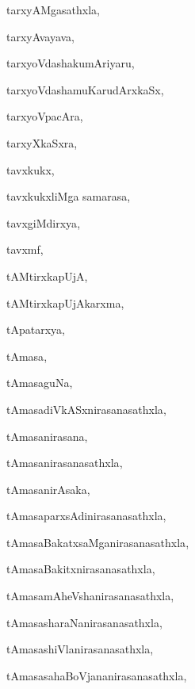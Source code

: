 \begin{multicols}{3}
{\noindent
{tarxyAMgasathxla}, \pageref{tarxyAMgasathxla}

\noindent
{tarxyAvayava}, \pageref{tarxyAvayava}

\noindent
{tarxyoVdashakumAriyaru}, \pageref{tarxyoVdashakumAriyaru}

\noindent
{tarxyoVdashamuKarudArxkaSx}, \pageref{tarxyoVdashamuKarudArxkaSx}

\noindent
{tarxyoVpacAra}, \pageref{tarxyoVpacAra}

\noindent
{tarxyXkaSxra}, \pageref{tarxyXkaSxra}

\noindent
{tavxkukx}, \pageref{tavxkukx}

\noindent
{tavxkukxliMga samarasa}, \pageref{tavxkukxliMga samarasa}

\noindent
{tavxgiMdirxya}, \pageref{tavxgiMdirxya}

\noindent
{tavxmf}, \pageref{tavxmf}

\noindent
{tAMtirxkapUjA}, \pageref{tAMtirxkapUjA}

\noindent
{tAMtirxkapUjAkarxma}, \pageref{tAMtirxkapUjAkarxma}

\noindent
{tApatarxya}, \pageref{tApatarxya}

\noindent
{tAmasa}, \pageref{tAmasa}

\noindent
{tAmasaguNa}, \pageref{tAmasaguNa}

\noindent
{tAmasadiVkASxnirasanasathxla}, \pageref{tAmasadiVkASxnirasanasathxla}

\noindent
{tAmasanirasana}, \pageref{tAmasanirasana}

\noindent
{tAmasanirasanasathxla}, \pageref{tAmasanirasanasathxla}

\noindent
{tAmasanirAsaka}, \pageref{tAmasanirAsaka}

\noindent
{tAmasaparxsAdinirasanasathxla}, \pageref{tAmasaparxsAdinirasanasathxla}

\noindent
{tAmasaBakatxsaMganirasanasathxla}, \pageref{tAmasaBakatxsaMganirasanasathxla}

\noindent
{tAmasaBakitxnirasanasathxla}, \pageref{tAmasaBakitxnirasanasathxla}

\noindent
{tAmasamAheVshanirasanasathxla}, \pageref{tAmasamAheVshanirasanasathxla}

\noindent
{tAmasasharaNanirasanasathxla}, \pageref{tAmasasharaNanirasanasathxla}

\noindent
{tAmasashiVlanirasanasathxla}, \pageref{tAmasashiVlanirasanasathxla}

\noindent
{tAmasasahaBoVjananirasanasathxla}, \pageref{tAmasasahaBoVjananirasanasathxla}

}
\end{multicols}
